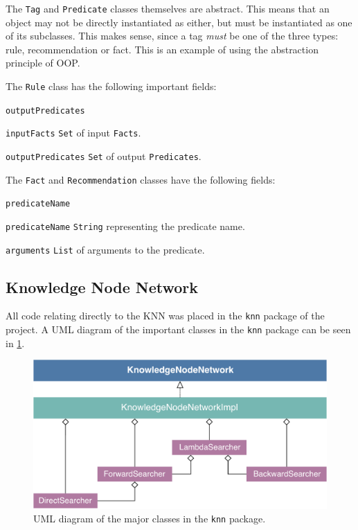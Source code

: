 \documentclass[titlepage,11pt]{article}
\newcommand{\code}[1]{\texttt{#1}}
\begin{document}
The \code{Tag} and \code{Predicate} classes themselves are abstract. This means that an object may not be directly instantiated as either, but must be instantiated as one of its subclasses. This makes sense, since a tag \emph{must} be one of the three types: rule, recommendation or fact. This is an example of using the abstraction principle of OOP.

The \code{Rule} class has the following important fields:

\begin{labeling}{\code{outputPredicates}}
	\item[\code{inputFacts}] \code{Set} of input \code{Facts}.
	\item[\code{outputPredicates}] \code{Set} of output \code{Predicates}.
\end{labeling}

The \code{Fact} and \code{Recommendation} classes have the following fields:

\begin{labeling}{\code{predicateName}}
	\item[\code{predicateName}] \code{String} representing the predicate name.
	\item[\code{arguments}] \code{List} of arguments to the predicate.
\end{labeling}

\subsection{Knowledge Node Network}

All code relating directly to the KNN was placed in the \code{knn} package of the project. A UML diagram of the important classes in the \code{knn} package can be seen in \cref{fig:uml_knn}.

\begin{figure}[!htb]
	\includegraphics[width=\columnwidth]{figures/uml_knn.pdf}
	\caption{UML diagram of the major classes in the \code{knn} package.}
	\label{fig:uml_knn}
\end{figure}
\end{document}

